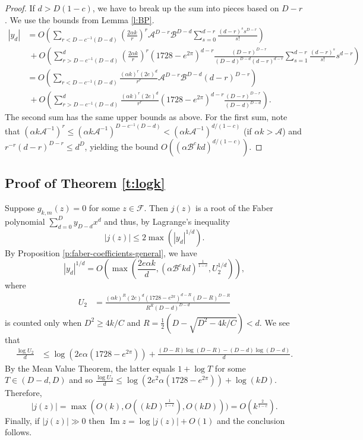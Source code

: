 \documentclass[12pt]{amsart}
\theoremstyle{plain} %
\theoremstyle{definition}
\theoremstyle{remark}
\numberwithin{equation}{section}
\renewcommand{\Im}{\operatorname{Im}}
\begin{document}
\begin{proof}
If $d>D(1-c)$, we have to break up the sum into pieces based on $D-r$. We use the bounds from Lemma \ref{l:BP}.
\begin{align*}
  |y_d|&=O\left(\sum_{r<D-c^{-1}(D-d)}\left(\frac{2 \alpha k}{r}\right)^r\mathcal{A}^{D-r}\mathcal{B}^{D-d}\sum_{s=0}^{d-r}\frac{(d-r)^ss^{D-r}}{s!}\right)\\
  &\
    +O\left(\sum_{r>D-c^{-1}(D-d)}^{d}\left(\frac{2 \alpha k}{r}\right)^r(1728-e^{2\pi})^{d-r}\frac{(D-r)^{D-r}}{(D-d)^{D-d}(d-r)^{d-r}}\sum_{s=1}^{d-r}\frac{(d-r)^s}{s!}s^{d-r}\right)\\
  &=
    O\left(\sum_{r<D-c^{-1}(D-d)}\frac{(\alpha k)^{r}(2e)^d}{r^r}\mathcal{A}^{D-r}\mathcal{B}^{D-d}(d-r)^{D-r}\right)\\
  &\ +O\left(\sum_{r>D-c^{-1}(D-d)}^{d}\frac{(\alpha k)^{r}(2e)^d}{r^r}(1728-e^{2\pi})^{d-r}\frac{(D-r)^{D-r}}{(D-d)^{D-d}}\right).
\end{align*}
The second sum has the same upper bounds as above. For the first sum, note that $(\alpha k \mathcal{A}^{-1})^r\leq (\alpha k \mathcal{A}^{-1})^{D-c^{-1}(D-d)}<(\alpha k \mathcal{A}^{-1})^{d/(1-c)}$ (if $\alpha k>\mathcal{A}$) and $r^{-r}(d-r)^{D-r}\leq d^D$, yielding the bound $O((\alpha \mathcal{B}^c kd)^{d/(1-c)})$.
\end{proof}
\subsection{Proof of Theorem \ref{t:logk}}
Suppose $g_{k,m}(z)=0$ for some $z\in \mathcal{F}$. Then $j(z)$
is a root of the Faber polynomial $\sum_{d=0}^D y_{D-d}x^d$ and
thus, by Lagrange's inequality
\[|j(z)|\leq 2\max (|y_d|^{1/d}).\]
By Proposition \ref{p:faber-coefficients-general}, we have
\[|y_d|^{1/d}=O\left(\max\left(\frac{2e \alpha k}{d},
(\alpha \mathcal{B}^c kd)^{\frac{1}{1-c}},
U_2^{1/d}\right)\right),\]
where
\begin{align*}
  U_2&=\frac{(\alpha k)^R(2e)^d(1728-e^{2\pi})^{d-R}(D-R)^{D-R}}{R^R(D-d)^{D-d}}
\end{align*}
is counted only when $D^2\geq 4k/C$ and
$R=\frac{1}{2}(D-\sqrt{D^2-4k/C})<d$. We see that
\begin{align*}
\frac{\log U_2}{d}&\leq \log(2e \alpha(1728-e^{2\pi}))+\frac{(D-R)\log(D-R)-(D-d)\log(D-d)}{d}.
\end{align*}
By the Mean Value Theorem, the latter equals $1+\log T$ for some
$T\in (D-d,D)$ and so
$\displaystyle \frac{\log U_2}{d}\leq \log(2e^2 \alpha(1728-e^{2\pi}))+\log(kD)$.
Therefore,
\[|j(z)|=\max(O(k), O((kD)^{\frac{1}{1-c}}), O(kD)))=O(k^{\frac{2}{1-c}}).\]
Finally, if $|j(z)|\gg 0$ then $\Im z=\log |j(z)|+O(1)$ and the conclusion follows.
\end{document}
